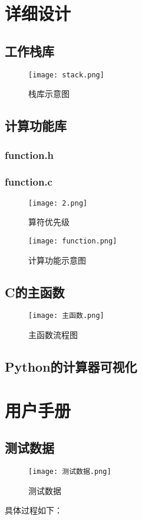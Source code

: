 \documentclass{DateStructure}
\begin{document}
\section{详细设计}
\subsection{工作栈库}
\begin{figure}[H] 
\centering
\texttt{[image: stack.png]}
\caption{栈库示意图}
\end{figure}

\subsection{计算功能库}
\subsubsection{function.h}

\subsubsection{function.c}
\begin{figure}[H] 
\centering
\texttt{[image: 2.png]}
\caption{算符优先级}
\end{figure}
\begin{figure}[H] 
\centering
\texttt{[image: function.png]}
\caption{计算功能示意图}
\end{figure}
	
\subsection{C的主函数}
\begin{figure}[H] 
\centering
\texttt{[image: 主函数.png]}
\caption{主函数流程图}
\end{figure}

\subsection{Python的计算器可视化}


\section{用户手册}
\subsection{测试数据}
\begin{figure}[H] 
\centering
\texttt{[image: 测试数据.png]}
\caption{测试数据}
\end{figure}
具体过程如下：\par
\end{document}
